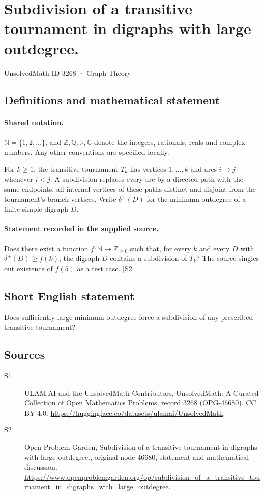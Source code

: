 \documentclass[11pt]{article}
\newcommand{\sref}[2]{\hyperlink{source:#1:#2}{[S#2]}}
\begin{document}
\setcounter{section}{3267}
\section{Subdivision of a transitive tournament in digraphs with large outdegree.}\label{3268}
{\small\sffamily UnsolvedMath ID 3268 · Graph Theory}
\subsection{Definitions and mathematical statement}

\paragraph{Shared notation.}$\mathbb N=\{1,2,\ldots\}$, and $\mathbb Z,\mathbb Q,\mathbb R,\mathbb C$ denote the integers, rationals, reals and complex numbers. Any other conventions are specified locally.


For $k\ge1$, the transitive tournament $T_k$ has vertices $1,\ldots,k$ and arcs $i\to j$ whenever $i<j$. A subdivision replaces every arc by a directed path with the same endpoints, all internal vertices of these paths distinct and disjoint from the tournament's branch vertices. Write $\delta^+(D)$ for the minimum outdegree of a finite simple digraph $D$.
\paragraph{Statement recorded in the supplied source.}
Does there exist a function $f:\mathbb N\to\mathbb Z_{\ge0}$ such that, for every $k$ and every $D$ with $\delta^+(D)\ge f(k)$, the digraph $D$ contains a subdivision of $T_k$? The source singles out existence of $f(5)$ as a test case. \sref{3268}{2}
\subsection{Short English statement}
Does sufficiently large minimum outdegree force a subdivision of any prescribed transitive tournament?
\subsection{Sources}
\begin{description}
\item[\hypertarget{source:3268:1}{S1}] ULAM.AI and the UnsolvedMath Contributors, UnsolvedMath: A Curated Collection of Open Mathematics Problems, record 3268 (OPG-46680). CC BY 4.0. \url{https://huggingface.co/datasets/ulamai/UnsolvedMath}.
\item[\hypertarget{source:3268:2}{S2}] Open Problem Garden, Subdivision of a transitive tournament in digraphs with large outdegree., original node 46680, statement and mathematical discussion. \url{https://www.openproblemgarden.org/op/subdivision_of_a_transitive_tournament_in_digraphs_with_large_outdegree}.
\end{description}
\label{end:3268}
\end{document}
